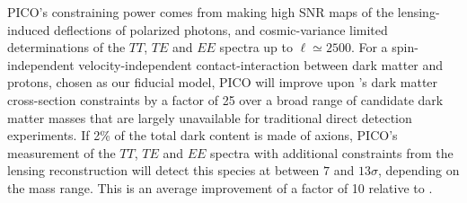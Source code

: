 \documentclass[PICOAPC.tex]{subfiles}
\begin{document}
PICO's constraining power comes from making high \ac{SNR} maps of the lensing-induced deflections of polarized photons, and cosmic-variance limited determinations of the $TT$, $TE$ and $EE$ spectra up to $\ell \simeq 2500$. 
For a spin-independent velocity-independent contact-interaction between dark matter and protons, chosen as our fiducial model, PICO will improve upon \planck 's dark matter cross-section constraints by a factor of 25 over a broad range of candidate dark matter masses that are largely unavailable for traditional direct detection experiments. %
If 2\% of the total dark content is made of axions, PICO's measurement of the $TT$, $TE$ and $EE$ spectra with additional constraints from the lensing reconstruction will detect this species at between $7$ and $13\sigma$, depending on the mass range. %
This is an average improvement of a factor of 10 relative to \planck .


 



%
\end{document}
